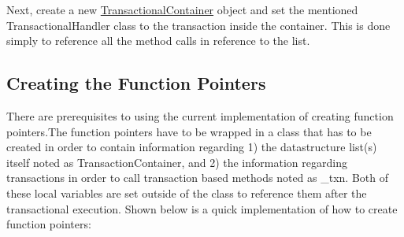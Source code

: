Next, create a new \hyperlink{classTransactionalContainer}{Transactional\+Container} object and set the mentioned Transactional\+Handler class to the transaction inside the container. This is done simply to reference all the method calls in reference to the list.\hypertarget{index_function_pointer}{}\subsection{Creating the Function Pointers}\label{index_function_pointer}
There are prerequisites to using the current implementation of creating function pointers.\+The function pointers have to be wrapped in a class that has to be created in order to contain information regarding 1) the datastructure list(s) itself noted as Transaction\+Container, and 2) the information regarding transactions in order to call transaction based methods noted as \+\_\+txn. Both of these local variables are set outside of the class to reference them after the transactional execution. Shown below is a quick implementation of how to create function pointers\+:


